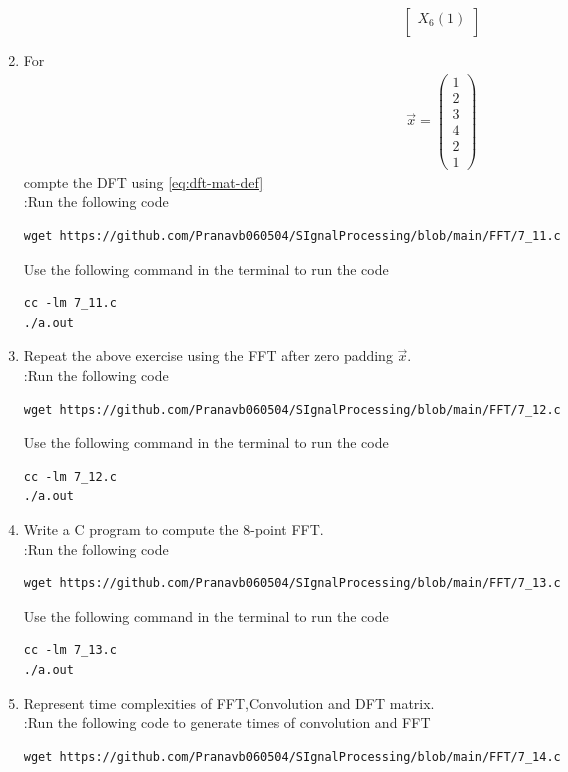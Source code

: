 \documentclass[journal,12pt,twocolumn]{IEEEtran}
\newcommand{\myvec}[1]{\ensuremath{\begin{pmatrix}#1\end{pmatrix}}}
\renewcommand\thesection{\arabic{section}}
\begin{document}
\begin{enumerate}[label=\arabic*.,ref=\thesection.\theenumi]
\begin{equation}
\begin{bmatrix}
X_{6}(1) \\ 
\end{bmatrix}
\end{equation}
\item For 
    \begin{align}
	    \vec{x} = \myvec{1\\2\\3\\4\\2\\1}
        \label{eq:equation1}
    \end{align}
    compte the DFT  
		using 
	    \eqref{eq:dft-mat-def}\\
\solution:Run the following code 
\begin{lstlisting}
wget https://github.com/Pranavb060504/SIgnalProcessing/blob/main/FFT/7_11.c
\end{lstlisting}
Use the following command in the terminal to run the code
\begin{lstlisting}
cc -lm 7_11.c
./a.out
\end{lstlisting}
    \item Repeat the above exercise using the FFT
    after zero padding $\vec{x}$.\\
    \solution:Run the following code 
\begin{lstlisting}
wget https://github.com/Pranavb060504/SIgnalProcessing/blob/main/FFT/7_12.c
\end{lstlisting}
Use the following command in the terminal to run the code
\begin{lstlisting}
cc -lm 7_12.c
./a.out
\end{lstlisting}
\item Write a C program to compute the 8-point FFT. \\
\solution:Run the following code 
\begin{lstlisting}
wget https://github.com/Pranavb060504/SIgnalProcessing/blob/main/FFT/7_13.c
\end{lstlisting}
Use the following command in the terminal to run the code
\begin{lstlisting}
cc -lm 7_13.c
./a.out
\end{lstlisting}
\item Represent time complexities of FFT,Convolution and DFT matrix.\\
\solution:Run the following code to generate times of convolution and FFT
\begin{lstlisting}
wget https://github.com/Pranavb060504/SIgnalProcessing/blob/main/FFT/7_14.c

\end{lstlisting}
\end{enumerate}
\end{document}
